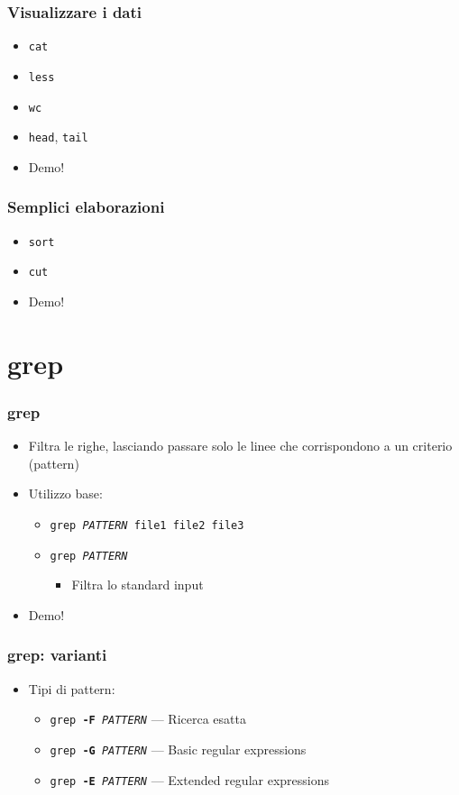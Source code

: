 \documentclass[xetex,table]{beamer}
\begin{document}
\begin{frame}
  \frametitle{Visualizzare i dati}
  \begin{itemize}
  \item \texttt{cat}
  \item \texttt{less}
  \item \texttt{wc}
  \item \texttt{head}, \texttt{tail}
  \item Demo!
  \end{itemize}
\end{frame}

\begin{frame}
  \frametitle{Semplici elaborazioni}
  \begin{itemize}
  \item \texttt{sort}
  \item \texttt{cut}
  \item Demo!
  \end{itemize}
\end{frame}

\section{grep}

\begin{frame}
  \frametitle{grep}
  \begin{itemize}
  \item Filtra le righe, lasciando passare solo le linee che
    corrispondono a un criterio (pattern)
  \item Utilizzo base:
    \begin{itemize}
    \item \texttt{grep {\em PATTERN} file1 file2 file3}
    \item \texttt{grep {\em PATTERN}}
      \begin{itemize}
        \item Filtra lo standard input
      \end{itemize}
    \end{itemize}
  \item Demo!
  \end{itemize}
\end{frame}

\begin{frame}
  \frametitle{grep: varianti}
  \begin{itemize}
  \item Tipi di pattern:
    \begin{itemize}
    \item \texttt{grep {\bf -F} \emph{PATTERN}} --- Ricerca esatta
    \item \texttt{grep {\bf -G} \emph{PATTERN}} --- Basic regular expressions
    \item \texttt{grep {\bf -E} \emph{PATTERN}} --- Extended regular expressions
    \end{itemize}
  \end{itemize}
\end{frame}
\end{document}
